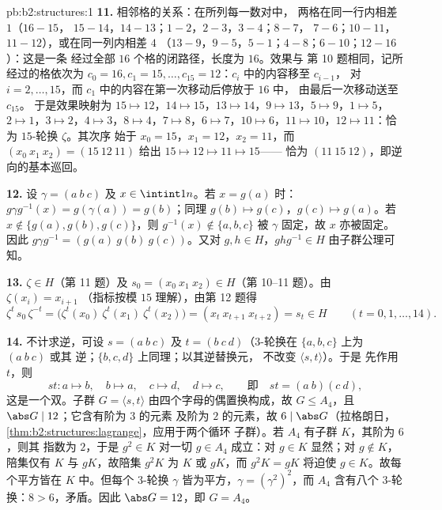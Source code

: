 \begin{solution}{pb:b2:structures:1}
\textbf{11.} 相邻格的关系：在所列每一数对中，
两格在同一行内相差 $1$（$16{-}15$，
$15{-}14$，$14{-}13$；$1{-}2$，$2{-}3$，$3{-}4$；$8{-}7$，
$7{-}6$；$10{-}11$，$11{-}12$），或在同一列内相差 $4$
（$13{-}9$，$9{-}5$，$5{-}1$；$4{-}8$；$6{-}10$；$12{-}16$）：这是一条
经过全部 $16$ 个格的闭路径，长度为 $16$。效果与
第 10 题相同，记所经过的格依次为 $c_0 = 16, c_1 = 15,
\dots, c_{15} = 12$：$c_i$ 中的内容移至 $c_{i-1}$，
对 $i = 2, \dots, 15$，而 $c_1$ 中的内容在第一次移动后停放于 $16$ 中，
由最后一次移动送至 $c_{15}$。
于是效果映射为 $15 \mapsto 12$，$14 \mapsto 15$，$13
\mapsto 14$，$9 \mapsto 13$，$5 \mapsto 9$，$1 \mapsto 5$，$2
\mapsto 1$，$3 \mapsto 2$，$4 \mapsto 3$，$8 \mapsto 4$，$7
\mapsto 8$，$6 \mapsto 7$，$10 \mapsto 6$，$11 \mapsto 10$，$12
\mapsto 11$：恰为 $15$-轮换 $\zeta$。其次序
始于 $x_0 = 15$，$x_1 = 12$，$x_2 = 11$，而 $(x_0\ x_1\ x_2)
= (15\ 12\ 11)$ 给出 $15 \mapsto 12 \mapsto 11 \mapsto 15$——
恰为 $(11\ 15\ 12)$，即逆向的基本巡回。

\textbf{12.} 设 $\gamma = (a\ b\ c)$ 及 $x \in \intint1n$。若
$x = g(a)$ 时：$g\gamma g^{-1}(x) = g(\gamma(a)) = g(b)$；同理
$g(b) \mapsto g(c)$，$g(c) \mapsto g(a)$。若 $x \notin
\{g(a), g(b), g(c)\}$，则 $g^{-1}(x) \notin \{a,b,c\}$
被 $\gamma$ 固定，故 $x$ 亦被固定。因此 $g\gamma g^{-1} =
(g(a)\ g(b)\ g(c))$。又对 $g, h \in H$，$ghg^{-1} \in H$
由子群公理可知。

\textbf{13.} $\zeta \in H$（第 11 题）及 $s_0 = (x_0\ x_1\
x_2) \in H$（第 10--11 题）。由 $\zeta(x_i) = x_{i+1}$
（指标按模 $15$ 理解），由第 12 题得
\[
\zeta^{t}\,s_0\,\zeta^{-t}
= \bigl(\zeta^t(x_0)\ \zeta^t(x_1)\ \zeta^t(x_2)\bigr)
= (x_t\ x_{t+1}\ x_{t+2}) = s_t \in H
\qquad (t = 0, 1, \dots, 14).
\]

\textbf{14.} 不计求逆，可设 $s = (a\ b\ c)$ 及 $t =
(b\ c\ d)$（$3$-轮换在 $\{a,b,c\}$ 上为 $(a\ b\ c)$ 或其
逆；$\{b,c,d\}$ 上同理；以其逆替换元，
不改变 $\langle s, t\rangle$）。于是
先作用 $t$，则
\[
st \colon a \mapsto b,\quad b \mapsto a,\quad c \mapsto d,\quad
d \mapsto c, \qquad\text{即}\quad st = (a\ b)(c\ d),
\]
这是一个双。子群 $G = \langle s, t\rangle$
由四个字母的偶置换构成，故 $G \leq
A_4$，且 $\abs G \mid 12$；它含有阶为 $3$ 的元素
及阶为 $2$ 的元素，故 $6 \mid \abs G$（拉格朗日，
\cref{thm:b2:structures:lagrange}，应用于两个循环
子群）。若 $A_4$ 有子群 $K$，其阶为 $6$，则其
指数为 $2$，于是 $g^2 \in K$ 对一切 $g \in A_4$ 成立：对
$g \in K$ 显然；对 $g \notin K$，陪集仅有
$K$ 与 $gK$，故陪集 $g^2K$ 为 $K$ 或 $gK$，而 $g^2K =
gK$ 将迫使 $g \in K$。故每个平方皆在 $K$ 中。但每个
$3$-轮换 $\gamma$ 皆为平方，$\gamma = (\gamma^2)^2$，而
$A_4$ 含有八个 $3$-轮换：$8 > 6$，矛盾。因此
$\abs G = 12$，即 $G = A_4$。


\end{solution}
